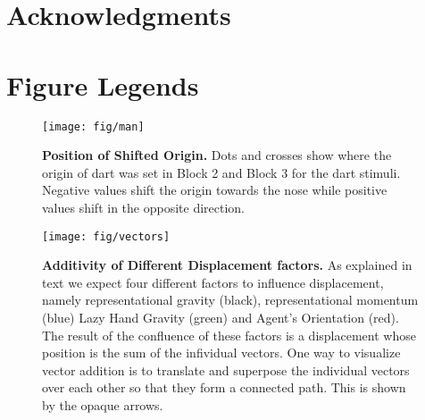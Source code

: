 \documentclass[10pt]{article}
\begin{document}
\section*{Acknowledgments}




\section*{Figure Legends}

\begin{figure}[!ht]
\begin{center}
\texttt{[image: fig/man]}
\end{center}
\caption{
{\bf Position of Shifted Origin.}
Dots and crosses show where the origin of dart was set in Block 2 and Block 3 for the dart stimuli. 
Negative values shift the origin towards the nose while positive values shift in the opposite direction.
}
\label{fig:man}
\end{figure}

\begin{figure}[!ht]
\begin{center}
\texttt{[image: fig/vectors]}
\end{center}
\caption{
{\bf Additivity of Different Displacement factors.}
As explained in text we expect four different factors to influence displacement, namely representational gravity (black), representational momentum (blue) Lazy Hand Gravity (green) and Agent's Orientation (red). The result of the confluence of these factors is a displacement whose position is the sum of the infividual vectors. One way to visualize vector addition is to translate and superpose the individual vectors over each other so that they form a connected path. This is shown by the opaque arrows.  
}\label{fig:vectors}
\end{figure}
\end{document}
